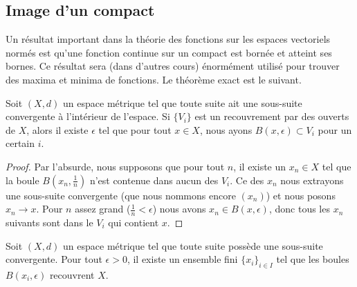 \subsection{Image d'un compact}

Un résultat important dans la théorie des fonctions sur les espaces vectoriels normés est qu'une fonction continue sur un compact est bornée et atteint ses bornes. Ce résultat sera (dans d'autres cours) énormément utilisé pour trouver des maxima et minima de fonctions. Le théorème exact est le suivant.

\begin{lemma}    \label{LemQFXOWyx}
    Soit \( (X,d)\) un espace métrique tel que toute suite ait une sous-suite convergente à l'intérieur de l'espace. Si \( \{ V_i \}\) est un recouvrement par des ouverts de \( X\), alors il existe \( \epsilon\) tel que pour tout \( x\in X\), nous ayons \( B(x,\epsilon)\subset V_i\) pour un certain \( i\).
\end{lemma}

\begin{proof}
    Par l'absurde, nous supposons que pour tout \( n\), il existe un \( x_n\in X\) tel que la boule \( B(x_n,\frac{1}{ n })\) n'est contenue dans aucun des \( V_i\). Ce des \( x_n\) nous extrayons une sous-suite convergente (que nous nommons encore \( (x_n)\)) et nous posons \( x_n\to x\). Pour \( n\) assez grand (\( \frac{1}{ n }<\epsilon\)) nous avons \( x_n\in B(x,\epsilon)\), donc tous les \( x_n\) suivants sont dans le \( V_i\) qui contient \( x\).
\end{proof}

\begin{lemma}   \label{LemMGQqgDG}
    Soit \( (X,d)\) un espace métrique tel que toute suite possède une sous-suite convergente. Pour tout \( \epsilon>0\), il existe un ensemble fini \( \{ x_i \}_{i\in I}\) tel que les boules \( B(x_i,\epsilon)\) recouvrent \( X\).
\end{lemma}

